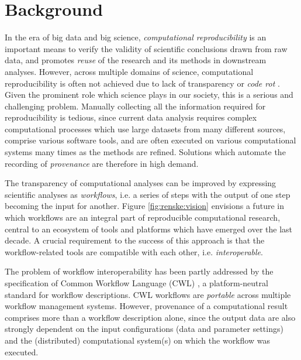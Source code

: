 \section{Background}
In the era of big data and big science, \emph{computational reproducibility} is an important means to verify the validity of scientific conclusions drawn from raw data, and promotes \emph{reuse} of the research and its methods in downstream analyses. However, across multiple domains of science, computational reproducibility is often not achieved due to lack of transparency or \emph{code rot} \cite{committeeonreproducibilityandreplicabilityinscienceReproducibilityReplicabilityScience2019}. Given the prominent role which science plays in our society, this is a serious and challenging problem. Manually collecting all the information required for reproducibility is tedious, %
since current data analysis requires complex computational processes which use large datasets from many different sources, comprise various software tools, and are often executed on various computational systems many times as the methods are refined. Solutions which automate the recording of \emph{provenance} are therefore in high demand.

The transparency of computational analyses can be improved by expressing scientific analyses as \emph{workflows}, i.e. a series of steps with the output of one step becoming the input for another. Figure \ref{fig:renske:vision} envisions a future in which workflows are an integral part of reproducible computational research, central to an ecosystem of tools and platforms which have emerged over the last decade. 
A crucial requirement to the success of this approach is that the workflow-related tools are compatible with each other, i.e. \emph{interoperable}. 

The problem of workflow interoperability has been partly addressed by the specification of Common Workflow Language (CWL) \citep{crusoe-methods-2022}, a platform-neutral standard for workflow descriptions. CWL workflows are \emph{portable} across multiple workflow management systems. However, provenance of a computational result comprises more than a workflow description alone,
since the output data are also strongly dependent on the input configurations (data and parameter settings) and the (distributed) computational system(s) on which the workflow was executed. 


